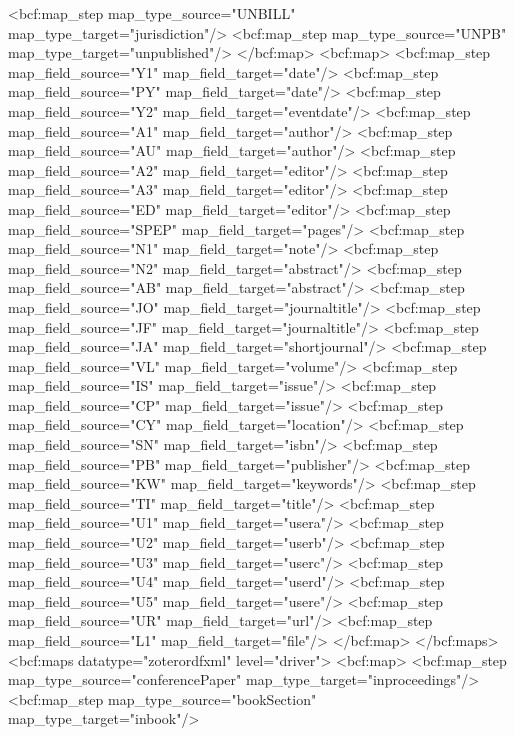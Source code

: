         <bcf:map_step map_type_source="UNBILL" map_type_target="jurisdiction"/>
        <bcf:map_step map_type_source="UNPB" map_type_target="unpublished"/>
      </bcf:map>
      <bcf:map>
        <bcf:map_step map_field_source="Y1" map_field_target="date"/>
        <bcf:map_step map_field_source="PY" map_field_target="date"/>
        <bcf:map_step map_field_source="Y2" map_field_target="eventdate"/>
        <bcf:map_step map_field_source="A1" map_field_target="author"/>
        <bcf:map_step map_field_source="AU" map_field_target="author"/>
        <bcf:map_step map_field_source="A2" map_field_target="editor"/>
        <bcf:map_step map_field_source="A3" map_field_target="editor"/>
        <bcf:map_step map_field_source="ED" map_field_target="editor"/>
        <bcf:map_step map_field_source="SPEP" map_field_target="pages"/>
        <bcf:map_step map_field_source="N1" map_field_target="note"/>
        <bcf:map_step map_field_source="N2" map_field_target="abstract"/>
        <bcf:map_step map_field_source="AB" map_field_target="abstract"/>
        <bcf:map_step map_field_source="JO" map_field_target="journaltitle"/>
        <bcf:map_step map_field_source="JF" map_field_target="journaltitle"/>
        <bcf:map_step map_field_source="JA" map_field_target="shortjournal"/>
        <bcf:map_step map_field_source="VL" map_field_target="volume"/>
        <bcf:map_step map_field_source="IS" map_field_target="issue"/>
        <bcf:map_step map_field_source="CP" map_field_target="issue"/>
        <bcf:map_step map_field_source="CY" map_field_target="location"/>
        <bcf:map_step map_field_source="SN" map_field_target="isbn"/>
        <bcf:map_step map_field_source="PB" map_field_target="publisher"/>
        <bcf:map_step map_field_source="KW" map_field_target="keywords"/>
        <bcf:map_step map_field_source="TI" map_field_target="title"/>
        <bcf:map_step map_field_source="U1" map_field_target="usera"/>
        <bcf:map_step map_field_source="U2" map_field_target="userb"/>
        <bcf:map_step map_field_source="U3" map_field_target="userc"/>
        <bcf:map_step map_field_source="U4" map_field_target="userd"/>
        <bcf:map_step map_field_source="U5" map_field_target="usere"/>
        <bcf:map_step map_field_source="UR" map_field_target="url"/>
        <bcf:map_step map_field_source="L1" map_field_target="file"/>
      </bcf:map>
    </bcf:maps>
    <bcf:maps datatype="zoterordfxml" level="driver">
      <bcf:map>
        <bcf:map_step map_type_source="conferencePaper" map_type_target="inproceedings"/>
        <bcf:map_step map_type_source="bookSection" map_type_target="inbook"/>
